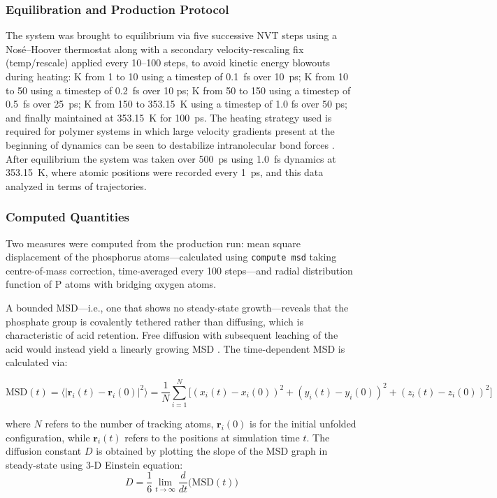 \documentclass[12pt,a4paper]{report}
\begin{document}
\subsubsection{Equilibration and Production Protocol}

The system was brought to equilibrium via five successive NVT steps using a Nos\'{e}--Hoover thermostat along with a secondary velocity-rescaling fix (temp/rescale) applied every 10--100 steps, to avoid kinetic energy blowouts during heating: K from 1 to 10 using a timestep of 0.1~fs over 10~ps; K from 10 to 50 using a timestep of 0.2~fs over 10 ps; K from 50 to 150 using a timestep of 0.5~fs over 25~ps; K from 150 to 353.15~K using a timestep of 1.0 fs over 50 ps; and finally maintained at 353.15~K for 100~ps. The heating strategy used is required for polymer systems in which large velocity gradients present at the beginning of dynamics can be seen to destabilize intranolecular bond forces \cite{104}. After equilibrium the system was taken over 500~ps using 1.0~fs dynamics at 353.15~K, where atomic positions were recorded every 1~ps, and this data analyzed in terms of trajectories.

\subsubsection{Computed Quantities}
Two measures were computed from the production run: mean square displacement of the phosphorus atoms—calculated using \texttt{compute msd} taking centre-of-mass correction, time-averaged every 100 steps—and radial distribution function of P atoms with bridging oxygen atoms. 

A bounded MSD—i.e., one that shows no steady-state growth—reveals that the phosphate group is covalently tethered rather than diffusing, which is characteristic of acid retention. Free diffusion with subsequent leaching of the acid would instead yield a linearly growing MSD \cite{64}. The time-dependent MSD is calculated via:

\begin{equation}
\text{MSD}(t) = \langle |\mathbf{r}_i(t) - \mathbf{r}_i(0)|^2 \rangle = \frac{1}{N}\sum_{i=1}^{N} \Big[ (x_i(t)-x_i(0))^2 + (y_i(t)-y_i(0))^2 + (z_i(t)-z_i(0))^2 \Big]
\end{equation}

where $N$ refers to the number of tracking atoms, $\mathbf{r}_{i}(0)$ is for the initial unfolded configuration, while $\mathbf{r}_{i}(t)$ refers to the positions at simulation time $t$. The diffusion constant $D$ is obtained by plotting the slope of the MSD graph in steady-state using 3-D Einstein equation:
\begin{equation}
D = \frac{1}{6} \lim_{t \to \infty} \frac{d}{dt} \Big( \text{MSD}(t) \Big)
\end{equation}
\end{document}
